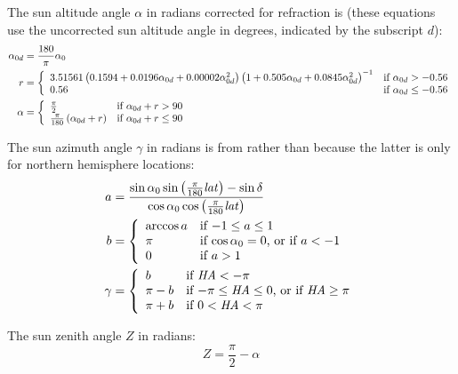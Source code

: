 \documentclass[12pt,letterpaper]{article}
\begin{document}
The sun altitude angle $\alpha$ in radians corrected for refraction is (these equations use the uncorrected sun altitude angle in degrees, indicated by the subscript $d$):
\begin{align}\label{eqn-elvcorr}
\alpha_{0d} &= \frac{180}{\pi}\alpha_0\notag\\
r &= \left\{
\begin{array}{ll}
3.51561\left(0.1594 + 0.0196\alpha_{0d} + 0.00002\alpha_{0d}^2\right) \left(1 + 0.505\alpha_{0d} + 0.0845\alpha_{0d}^2\right)^{-1} & \text{if $\alpha_{0d}>-0.56$}\\
0.56 & \text{if $\alpha_{0d} \leq -0.56$}
\end{array}
\right.\notag\\
\alpha & = \left\{
\begin{array}{ll}
\frac{\pi}{2} & \text{if $\alpha_{0d} + r > 90$}\\
\frac{\pi}{180}\left(\alpha_{0d} + r\right) & \text{if $\alpha_{0d} + r \leq 90$}
\end{array}
\right.
\end{align}

The sun azimuth angle $\gamma$ in radians is from \citep{iqbal1983} rather than \citep{michalsky1988} because the latter is only for northern hemisphere locations:
\begin{align}\label{eqn-solaraz}
a &= \frac{\sin\alpha_0 \sin\left(\frac{\pi}{180}\mathit{lat}\right) - \sin\delta}{\cos\alpha_0 \cos\left(\frac{\pi}{180}\mathit{lat}\right)}\notag\\
b &= \left\{
\begin{array}{ll}
\arccos a & \text{if $-1 \leq a \leq 1$}\\
\pi & \text{if $\cos\alpha_0=0$, or if $a < -1$}\\
0 & \text{if $a > 1$}
\end{array}
\right.\notag\\
\gamma &= \left\{
\begin{array}{ll}
b & \text{if $\mathit{HA} < -\pi$}\\
\pi - b & \text{if $-\pi \leq \mathit{HA} \leq 0$, or if $\mathit{HA} \geq \pi$}\\
\pi + b & \text{if $0 < \mathit{HA} < \pi$}
\end{array}
\right.
\end{align}

The sun zenith angle $Z$ in radians:
\begin{equation}\label{eqn-zen}
Z = \frac{\pi}{2}-\alpha
\end{equation}
\end{document}
